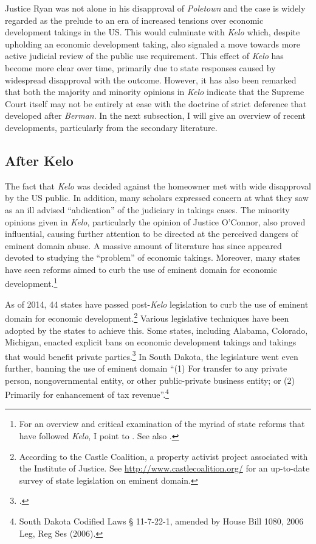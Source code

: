 Justice Ryan was not alone in his disapproval of {\it Poletown} and the case is widely regarded as the prelude to an era of increased tensions over economic development takings in the US. This would culminate with {\it Kelo} which, despite upholding an economic development taking, also signaled a move towards more active judicial review of the public use requirement. This effect of {\it Kelo} has become more clear over time, primarily due to state responses caused by widespread disapproval with the outcome. However, it has also been remarked that both the majority and minority opinions in {\it Kelo} indicate that the Supreme Court itself may not be entirely at ease with the doctrine of strict deference that developed after {\it Berman}. In the next subsection, I will give an overview of recent developments, particularly from the secondary literature.

\subsection{After Kelo}

The fact that {\it Kelo} was decided against the homeowner met with wide disapproval by the US public. In addition, many scholars expressed concern at what they saw as an ill advised ``abdication'' of the judiciary in takings cases. The minority opinions given in {\it Kelo}, particularly the opinion of Justice O'Connor, also proved influential, causing further attention to be directed at the perceived dangers of eminent domain abuse. A massive amount of literature has since appeared devoted to studying the ``problem'' of economic takings. Moreover,  many states have seen reforms aimed to curb the use of eminent domain for economic development.\footnote{For an overview and critical examination of the myriad of state reforms that have followed {\it Kelo}, I point to \cite{eagle08}. See also \cite{somin09}.} 

As of 2014, 44 states have passed post-{\it Kelo} legislation to curb the use of eminent domain for economic development.\footnote{According to the Castle Coalition, a property activist project associated with the Institute of Justice. See \url{http://www.castlecoalition.org/} for an up-to-date survey of state legislation on eminent domain.} Various legislative techniques have been adopted by the states to achieve this. Some states, including Alabama, Colorado, Michigan, enacted explicit bans on economic development takings and takings that would benefit private parties.\footcite[See][107-108]{eagle08} In South Dakota, the legislature went even further, banning the use of eminent domain  ``(1) For transfer to any private person, nongovernmental entity, or other public-private business entity; or (2) Primarily for enhancement of tax revenue''.\footnote{South Dakota Codified Laws § 11-7-22-1, amended by House Bill 1080, 2006 Leg, Reg Ses (2006).}

